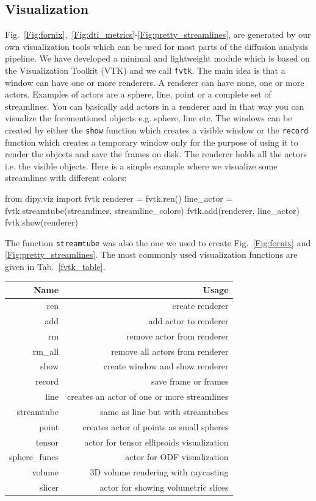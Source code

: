 \documentclass{bioinfo}
\begin{document}
\subsection{Visualization}
Fig.~\ref{Fig:fornix},~\ref{Fig:dti_metrics}-\ref{Fig:pretty_streamlines},
are generated by
our own visualization tools which can be used for most parts of the diffusion
analysis pipeline. We have developed a minimal and lightweight module which is based on the Visualization Toolkit (VTK) \citep{schroeder:01} and we call
\texttt{fvtk}. The main idea is that a window can have one or more renderers.
A renderer can have none, one or more actors. Examples of actors are a sphere,
line, point or a complete set of streamlines. You can basically add actors in a
renderer and in that way you can visualize the forementioned objects e.g.
sphere, line etc. The windows can
be created by either the \texttt{show} function which creates a visible window
or the \texttt{record} function which creates a temporary window only for the
purpose of using it to render the objects and save the frames on disk. The
renderer holds all the actors i.e. the visible objects. Here is a simple example
where we visualize some streamlines with different colors:
\begin{python}
from dipy.viz import fvtk
renderer = fvtk.ren()
line_actor = fvtk.streamtube(streamlines,
                             streamline_colors)
fvtk.add(renderer, line_actor)
fvtk.show(renderer)
\end{python}
The function \texttt{streamtube} was also the one we used to create Fig.~\ref{Fig:fornix} and \ref{Fig:pretty_streamlines}. 
The most commonly used visualization functions are given in Tab.~\ref{fvtk_table}.

\begin{table}[th] 
{\begin{tabular}{rr} \hline
Name & Usage \\ \hline
ren & create renderer\\
add & add actor to renderer\\
rm  & remove actor from renderer \\
rm\_all & remove all actors from renderer \\
show & create window and show renderer \\
record & save frame or frames \\
line & creates an actor of one or more streamlines \\
streamtube & same as line but with streamtubes \\
point & creates actor of points as small spheres \\
tensor & actor for tensor ellipsoids visualization\\
sphere\_funcs & actor for ODF visualization \\
volume & 3D volume rendering with raycasting \\
slicer & actor for showing volumetric slices \\
\hline
\end{tabular}}{}
\end{table}
\end{document}
